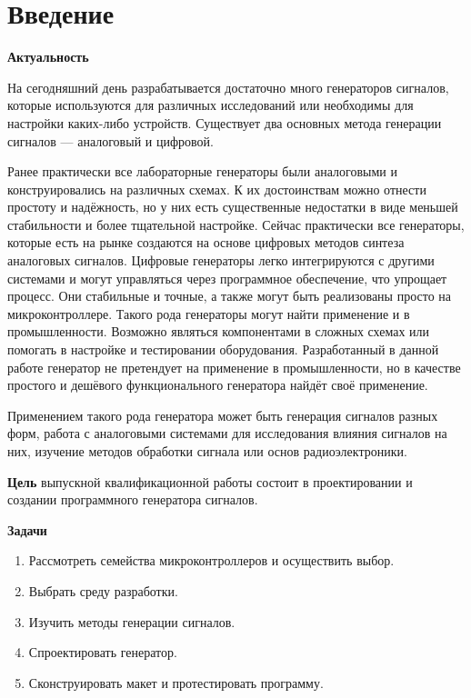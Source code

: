 \chapter*{Введение}

\textbf{Актуальность}

	На сегодняшний день разрабатывается достаточно много генераторов сигналов, которые используются для различных исследований или необходимы для настройки каких-либо устройств. Существует два основных метода генерации сигналов --- аналоговый и цифровой.
	
	Ранее практически все лабораторные генераторы были аналоговыми и конструировались на различных схемах. К их достоинствам можно отнести простоту и надёжность, но у них есть существенные недостатки в виде меньшей стабильности и более тщательной настройке. Сейчас практически все генераторы, которые есть на рынке создаются на основе цифровых методов синтеза аналоговых сигналов. Цифровые генераторы легко интегрируются с другими системами и могут управляться через программное обеспечение, что упрощает процесс. Они стабильные и точные, а также могут быть реализованы просто на микроконтроллере. Такого рода генераторы могут найти применение и в промышленности. Возможно являться компонентами в сложных схемах или помогать в настройке и тестировании оборудования. Разработанный в данной работе генератор не претендует на применение в промышленности, но в качестве простого и дешёвого функционального генератора найдёт своё применение.
	
	Применением такого рода генератора может быть генерация сигналов разных форм, работа с аналоговыми системами для исследования влияния сигналов на них, изучение методов обработки сигнала или основ радиоэлектроники. 
	
\textbf{Цель}
выпускной квалификационной работы состоит в проектировании
и создании программного генератора сигналов.

\textbf{Задачи}

\begin{enumerate}
\item Рассмотреть семейства микроконтроллеров и осуществить выбор.
\item Выбрать среду разработки.
\item Изучить методы генерации сигналов.
\item Спроектировать генератор.
\item Сконструировать макет и протестировать программу.
\end{enumerate}

